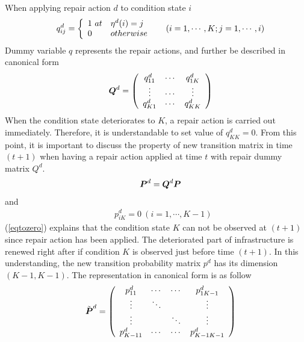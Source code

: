 When applying repair action $d$ to condition state $i$
\begin{eqnarray}
&& q_{ij}^{d}=\left\{
\begin{array}{ll}
1\ at & \eta^{d}(i)=j \\
0 & otherwise \\
\end{array}
\right. 
\hspace{5mm} (i=1,\cdots,K;j=1,\cdots,i)
\end{eqnarray}
Dummy variable $q$ represents the repair actions, and further be described in canonical form
\begin{eqnarray}
&& \mbox{\boldmath$Q$}^{d}=\left(
\begin{array}{ccc}
q_{11}^{d} & \cdots & q_{1K}^{d} \\
\vdots & \cdots & \vdots \\
q_{K1}^{d} & \cdots & q_{KK}^{d} \\
\end{array}
\right) \label{suiii}
\end{eqnarray}
When the condition state deteriorates to $K$, a repair action is carried out immediately. Therefore, it is understandable to set value of $q_{KK}^{d}=0$. From this point, it is important to discuss the property of new transition matrix in time $(t+1)$ when having a repair action applied at time $t$ with repair dummy matrix $Q^d$.
\begin{eqnarray}
&& \mbox{\boldmath$P$}^{d}=\mbox{\boldmath$Q$}^{d}\mbox{\boldmath$P$} \label{markovian}
\end{eqnarray}
and
\begin{eqnarray}
&& p_{iK}^{d}=0 \ (i=1,\cdots,K-1) \label{eqtozero}
\end{eqnarray}
(\ref{eqtozero}) explains that the condition state $K$ can not be observed at $(t+1)$ since repair action has been applied. The deteriorated part of infrastructure is renewed right after if condition $K$ is observed just before time $(t+1)$. In this understanding, the new transition probability matrix $p^d$ has its dimension $(K-1, K-1)$. The representation in canonical form is as follow
\begin{eqnarray}
&& \tilde{\mbox{\boldmath$P$}}^{d}
= \left(
\begin{array}{cccc}
p_{11}^d & \cdots & \cdots & p_{1K-1}^d \\
\vdots & \ddots &        & \vdots \\
\vdots &        & \ddots & \vdots \\
p_{K-11}^d & \cdots & \cdots & p_{K-1K-1}^d
\end {array}
\right) \label{k1}
\end{eqnarray}
